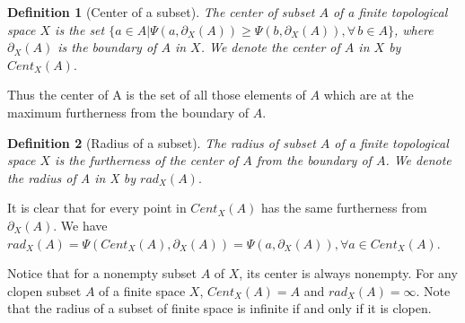 \documentclass[12pt]{amsart}
\newtheorem{definition}{Definition}[section]
\begin{document}
\begin{definition}[Center of a subset] 
	The center of subset $A$ of a finite topological space $X$ is the set
	$ \{a \in A | \Psi(a,\partial_{X}(A)) \geq \Psi(b,\partial_{X}(A)), \forall\, b \in A\}$, where $\partial_{X}(A)$ is the boundary of $A$ in $X$. We denote the center of $A$ in $X$ by $Cent_{X}(A).$
	
	
	
	
	
\end{definition}


Thus the center of A is the set of all those elements of $A$ which are at the maximum furtherness from the boundary of $A$. 

\begin{definition}[Radius of a subset]
	The radius of subset $A$ of a finite topological space $X$ is the furtherness of the center of $A$ from the boundary of $A$.  We denote the radius of A in X by $rad_{X}(A).$ 
\end{definition}

It is clear that for every point in $Cent_{X}(A)$ has the same furtherness from $\partial_{X}(A)$. We have $rad_{X}(A)= \Psi(Cent_{X}(A),\partial_{X}(A)) = \Psi(a, \partial_{X}(A)) , \forall a\in Cent_{X}(A)$.\par 
Notice that for a nonempty subset $A$ of $X$, its center is always nonempty. For any clopen subset $A$ of a finite space $X$, $Cent_{X}(A)= A$ and $rad_{{X}}(A) = \infty$.
Note that the radius of a subset of finite space is infinite if and only if it is clopen. \vspace{3mm}
\end{document}
